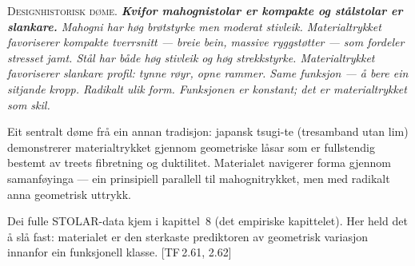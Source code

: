 \documentclass[10pt]{book}
\theoremstyle{definition}
\theoremstyle{plain}
\theoremstyle{remark}
\newenvironment{designhistorie}%
  {\medskip\noindent\textsc{Designhistorisk d\o me.}\itshape\enspace}%
  {\medskip}
\newcommand{\TF}[1]{\textnormal{[TF\,#1]}}
\begin{document}
\begin{designhistorie}
\textbf{Kvifor mahognistolar er kompakte og st\aa lstolar er slankare.} Mahogni har h\o g br\o tstyrke men moderat stivleik. Materialtrykket favoriserer kompakte tverrsnitt --- breie bein, massive ryggst\o tter --- som fordeler stresset jamt. St\aa l har b\aa de h\o g stivleik og h\o g strekkstyrke. Materialtrykket favoriserer slankare profil: tynne r\o yr, opne rammer. Same funksjon --- \aa{} bere ein sitjande kropp. Radikalt ulik form. Funksjonen er konstant; det er materialtrykket som skil.

Eit sentralt d\o me fr\aa{} ein annan tradisjon: japansk tsugi-te (tresamband utan lim) demonstrerer materialtrykket gjennom geometriske l\aa sar som er fullstendig bestemt av treets fibretning og duktilitet. Materialet navigerer forma gjennom samanf\o yinga --- ein prinsipiell parallell til mahognitrykket, men med radikalt anna geometrisk uttrykk.

Dei fulle STOLAR-data kjem i kapittel~8 (det empiriske kapittelet). Her held det \aa{} sl\aa{} fast: materialet er den sterkaste prediktoren av geometrisk variasjon innanfor ein funksjonell klasse. \TF{2.61, 2.62}
\end{designhistorie}
\end{document}
